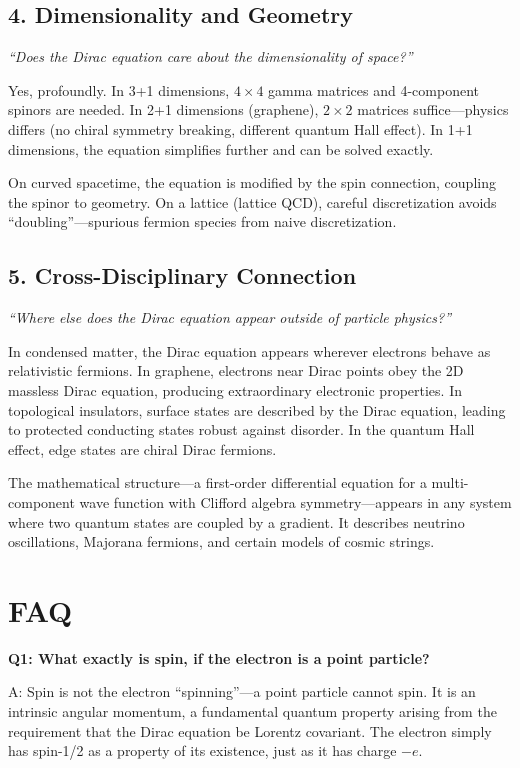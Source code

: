 \subsection*{4. Dimensionality and Geometry}
\textit{``Does the Dirac equation care about the dimensionality of space?''}

Yes, profoundly. In 3+1 dimensions, $4\times 4$ gamma matrices and 4-component spinors are needed. In 2+1 dimensions (graphene), $2\times 2$ matrices suffice---physics differs (no chiral symmetry breaking, different quantum Hall effect). In 1+1 dimensions, the equation simplifies further and can be solved exactly.

On curved spacetime, the equation is modified by the spin connection, coupling the spinor to geometry. On a lattice (lattice QCD), careful discretization avoids ``doubling''---spurious fermion species from naive discretization.

\subsection*{5. Cross-Disciplinary Connection}
\textit{``Where else does the Dirac equation appear outside of particle physics?''}

In condensed matter, the Dirac equation appears wherever electrons behave as relativistic fermions. In graphene, electrons near Dirac points obey the 2D massless Dirac equation, producing extraordinary electronic properties. In topological insulators, surface states are described by the Dirac equation, leading to protected conducting states robust against disorder. In the quantum Hall effect, edge states are chiral Dirac fermions.

The mathematical structure---a first-order differential equation for a multi-component wave function with Clifford algebra symmetry---appears in any system where two quantum states are coupled by a gradient. It describes neutrino oscillations, Majorana fermions, and certain models of cosmic strings.


\section*{FAQ}

\textbf{Q1: What exactly is spin, if the electron is a point particle?}

A: Spin is not the electron ``spinning''---a point particle cannot spin. It is an intrinsic angular momentum, a fundamental quantum property arising from the requirement that the Dirac equation be Lorentz covariant. The electron simply has spin-1/2 as a property of its existence, just as it has charge $-e$.


